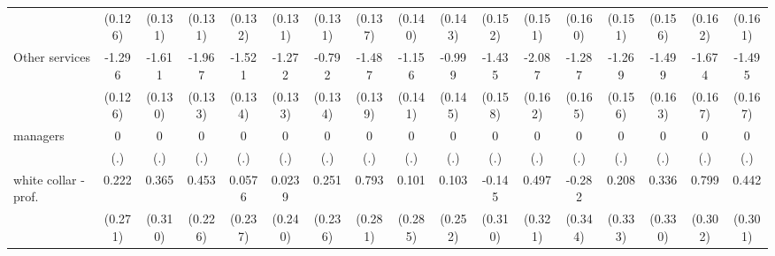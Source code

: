 {\begin{tabular}{l*{16}{c}}
                    &     (0.126)         &     (0.131)         &     (0.131)         &     (0.132)         &     (0.131)         &     (0.131)         &     (0.137)         &     (0.140)         &     (0.143)         &     (0.152)         &     (0.151)         &     (0.160)         &     (0.151)         &     (0.156)         &     (0.162)         &     (0.161)         \\
[1em]
Other services      &      -1.296\sym{***}&      -1.611\sym{***}&      -1.967\sym{***}&      -1.521\sym{***}&      -1.272\sym{***}&      -0.792\sym{***}&      -1.487\sym{***}&      -1.156\sym{***}&      -0.999\sym{***}&      -1.435\sym{***}&      -2.087\sym{***}&      -1.287\sym{***}&      -1.269\sym{***}&      -1.499\sym{***}&      -1.674\sym{***}&      -1.495\sym{***}\\
                    &     (0.126)         &     (0.130)         &     (0.133)         &     (0.134)         &     (0.133)         &     (0.134)         &     (0.139)         &     (0.141)         &     (0.145)         &     (0.158)         &     (0.162)         &     (0.165)         &     (0.156)         &     (0.163)         &     (0.167)         &     (0.167)         \\
[1em]
managers            &           0         &           0         &           0         &           0         &           0         &           0         &           0         &           0         &           0         &           0         &           0         &           0         &           0         &           0         &           0         &           0         \\
                    &         (.)         &         (.)         &         (.)         &         (.)         &         (.)         &         (.)         &         (.)         &         (.)         &         (.)         &         (.)         &         (.)         &         (.)         &         (.)         &         (.)         &         (.)         &         (.)         \\
[1em]
white collar - prof.&       0.222         &       0.365         &       0.453\sym{*}  &      0.0576         &      0.0239         &       0.251         &       0.793\sym{**} &       0.101         &       0.103         &      -0.145         &       0.497         &      -0.282         &       0.208         &       0.336         &       0.799\sym{**} &       0.442         \\
                    &     (0.271)         &     (0.310)         &     (0.226)         &     (0.237)         &     (0.240)         &     (0.236)         &     (0.281)         &     (0.285)         &     (0.252)         &     (0.310)         &     (0.321)         &     (0.344)         &     (0.333)         &     (0.330)         &     (0.302)         &     (0.301)         \\

\end{tabular}}
